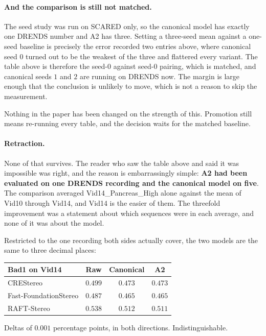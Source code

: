 \documentclass[11pt,a4paper]{article}
\begin{document}
\paragraph{And the comparison is still not matched.} The seed study was
run on SCARED only, so the canonical model has exactly one DRENDS number
and A2 has three. Setting a three-seed mean against a one-seed baseline is
precisely the error recorded two entries above, where canonical seed $0$
turned out to be the weakest of the three and flattered every variant.
The table above is therefore the seed-$0$ against seed-$0$ pairing, which
is matched, and canonical seeds $1$ and $2$ are running on DRENDS now.
The margin is large enough that the conclusion is unlikely to move, which
is not a reason to skip the measurement.

Nothing in the paper has been changed on the strength of this. Promotion
still means re-running every table, and the decision waits for the matched
baseline.

\paragraph{Retraction.} None of that survives. The reader who saw the
table above and said it was impossible was right, and the reason is
embarrassingly simple: \textbf{A2 had been evaluated on one DRENDS
recording and the canonical model on five}. The comparison averaged
Vid14\_Pancreas\_High alone against the mean of Vid10 through Vid14, and
Vid14 is the easier of them. The threefold improvement was a statement
about which sequences were in each average, and none of it was about the
model.

Restricted to the one recording both sides actually cover, the two models
are the same to three decimal places:

\begin{center}
\begin{tabular}{lccc}
\toprule
Bad1 on Vid14 & Raw & Canonical & A2 \\
\midrule
CREStereo             & $0.499$ & $0.473$ & $0.473$ \\
Fast-FoundationStereo & $0.487$ & $0.465$ & $0.465$ \\
RAFT-Stereo           & $0.538$ & $0.512$ & $0.511$ \\
\bottomrule
\end{tabular}
\end{center}

Deltas of $0.001$ percentage points, in both directions. Indistinguishable.
\end{document}
